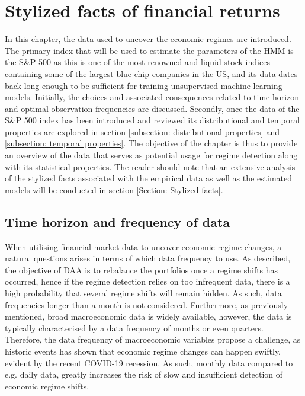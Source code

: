 \section{Stylized facts of financial returns}
\label{section: Data}
In this chapter, the data used to uncover the economic regimes are introduced. The primary index that will be used to estimate the parameters of the HMM is the S\&P 500 as this is one of the most renowned and liquid stock indices containing some of the largest blue chip companies in the US, and its data dates back long enough to be sufficient for training unsupervised machine learning models. Initially, the choices and associated consequences related to time horizon and optimal observation frequencies are discussed. Secondly, once the data of the S\&P 500 index has been introduced and reviewed its distributional and temporal properties are explored in section \ref{subsection: distributional properties} and \ref{subsection: temporal properties}. The objective of the chapter is thus to provide an overview of the data that serves as potential usage for regime detection along with its statistical properties. The reader should note that an extensive analysis of the stylized facts associated with the empirical data as well as the estimated models will be conducted in section \ref{Section: Stylized facts}.  

\subsection*{Time horizon and frequency of data}
\label{subsection: Data frequency}
When utilising financial market data to uncover economic regime changes, a natural questions arises in terms of which data frequency to use. As described, the objective of DAA is to rebalance the portfolios once a regime shifts has occurred, hence if the regime detection relies on too infrequent data, there is a high probability that several regime shifts will remain hidden. As such, data frequencies longer than a month is not considered. Furthermore, as previously mentioned, broad macroeconomic data is widely available, however, the data is typically characterised by a data frequency of months or even quarters. Therefore, the data frequency of macroeconomic variables propose a challenge, as historic events has shown that economic regime changes can happen swiftly, evident by the recent COVID-19 recession. As such, monthly data compared to e.g. daily data, greatly increases the risk of slow and insufficient detection of economic regime shifts.
 
